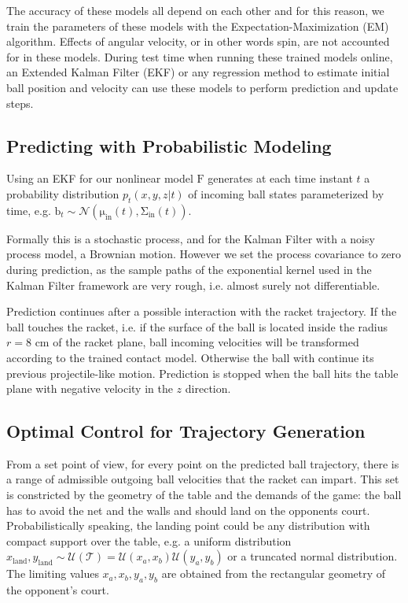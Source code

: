 \documentclass[letterpaper, 10 pt, conference]{ieeeconf}
\newcommand{\boldvec}[1]{\boldsymbol{\mathrm{#1}}}
\let\vec\boldvec
\newcommand{\ball}{\vec{b}} %
\newcommand{\ballDynamics}{\vec{F}} %
\newcommand{\racketRadius}{r} %
\newcommand{\court}{\mathcal{T}} %
\begin{document}
The accuracy of these models all depend on each other and for this reason, we train the parameters of these models with the Expectation-Maximization (EM) algorithm. Effects of angular velocity, or in other words spin, are not accounted for in these models. During test time when running these trained models online, an Extended Kalman Filter (EKF) or any regression method to estimate initial ball position and velocity can use these models to perform prediction and update steps.

\subsection{Predicting with Probabilistic Modeling}

Using an EKF for our nonlinear model $\ballDynamics$ generates at each time instant $t$ a probability distribution $p_t(x,y,z|t)$ of incoming ball states parameterized by time, e.g. $\ball_t \sim \mathcal{N}(\vec{\mu}_{\textrm{in}}(t),\vec{\Sigma}_{\textrm{in}}(t))$. 


Formally this is a stochastic process, and for the Kalman Filter with a noisy process model, a Brownian motion. However we set the process covariance to zero during prediction, as the sample paths of the exponential kernel used in the Kalman Filter framework are very rough, i.e. almost surely not differentiable.

Prediction continues after a possible interaction with the racket trajectory. If the ball touches the racket, i.e. if the surface of the ball is located inside the radius $\racketRadius = 8$ cm of the racket plane, ball incoming velocities will be transformed according to the trained contact model. Otherwise the ball with continue its previous projectile-like motion. Prediction is stopped when the ball hits the table plane with negative velocity in the $z$ direction.

\subsection{Optimal Control for Trajectory Generation}

From a set point of view, for every point on the predicted ball trajectory, there is a range of admissible outgoing ball velocities that the racket can impart. This set is constricted by the geometry of the table and the demands of the game: the ball has to avoid the net and the walls and should land on the opponents court. Probabilistically speaking, the landing point could be any distribution with compact support over the table, e.g. a uniform distribution $x_{\textrm{land}}, y_{\textrm{land}} \sim \mathcal{U}(\court) = \mathcal{U}(x_{a},x_{b})\mathcal{U}(y_{a},y_{b})$ or a truncated normal distribution. The limiting values $x_{a},x_{b},y_{a},y_{b}$ are obtained from the rectangular geometry of the opponent's court.
%
\end{document}
